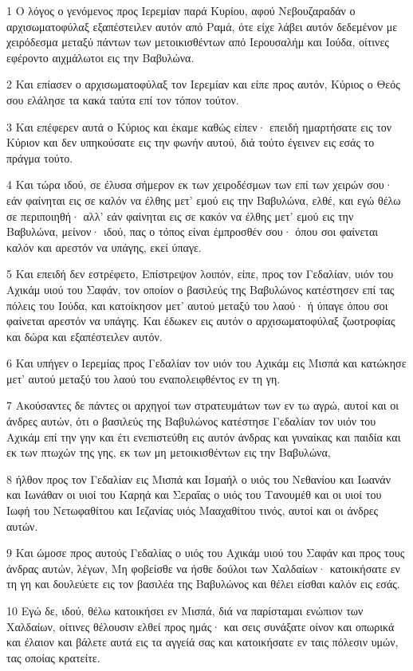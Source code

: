 \par 1 Ο λόγος ο γενόμενος προς Ιερεμίαν παρά Κυρίου, αφού Νεβουζαραδάν ο αρχισωματοφύλαξ εξαπέστειλεν αυτόν από Ραμά, ότε είχε λάβει αυτόν δεδεμένον με χειρόδεσμα μεταξύ πάντων των μετοικισθέντων από Ιερουσαλήμ και Ιούδα, οίτινες εφέροντο αιχμάλωτοι εις την Βαβυλώνα.
\par 2 Και επίασεν ο αρχισωματοφύλαξ τον Ιερεμίαν και είπε προς αυτόν, Κύριος ο Θεός σου ελάλησε τα κακά ταύτα επί τον τόπον τούτον.
\par 3 Και επέφερεν αυτά ο Κύριος και έκαμε καθώς είπεν· επειδή ημαρτήσατε εις τον Κύριον και δεν υπηκούσατε εις την φωνήν αυτού, διά τούτο έγεινεν εις εσάς το πράγμα τούτο.
\par 4 Και τώρα ιδού, σε έλυσα σήμερον εκ των χειροδέσμων των επί των χειρών σου· εάν φαίνηται εις σε καλόν να έλθης μετ' εμού εις την Βαβυλώνα, ελθέ, και εγώ θέλω σε περιποιηθή· αλλ' εάν φαίνηται εις σε κακόν να έλθης μετ' εμού εις την Βαβυλώνα, μείνον· ιδού, πας ο τόπος είναι έμπροσθέν σου· όπου σοι φαίνεται καλόν και αρεστόν να υπάγης, εκεί ύπαγε.
\par 5 Και επειδή δεν εστρέφετο, Επίστρεψον λοιπόν, είπε, προς τον Γεδαλίαν, υιόν του Αχικάμ υιού του Σαφάν, τον οποίον ο βασιλεύς της Βαβυλώνος κατέστησεν επί τας πόλεις του Ιούδα, και κατοίκησον μετ' αυτού μεταξύ του λαού· ή ύπαγε όπου σοι φαίνεται αρεστόν να υπάγης. Και έδωκεν εις αυτόν ο αρχισωματοφύλαξ ζωοτροφίας και δώρα και εξαπέστειλεν αυτόν.
\par 6 Και υπήγεν ο Ιερεμίας προς Γεδαλίαν τον υιόν του Αχικάμ εις Μισπά και κατώκησε μετ' αυτού μεταξύ του λαού του εναπολειφθέντος εν τη γη.
\par 7 Ακούσαντες δε πάντες οι αρχηγοί των στρατευμάτων των εν τω αγρώ, αυτοί και οι άνδρες αυτών, ότι ο βασιλεύς της Βαβυλώνος κατέστησε Γεδαλίαν τον υιόν του Αχικάμ επί την γην και έτι ενεπιστεύθη εις αυτόν άνδρας και γυναίκας και παιδία και εκ των πτωχών της γης, εκ των μη μετοικισθέντων εις την Βαβυλώνα,
\par 8 ήλθον προς τον Γεδαλίαν εις Μισπά και Ισμαήλ ο υιός του Νεθανίου και Ιωανάν και Ιωνάθαν οι υιοί του Καρηά και Σεραΐας ο υιός του Τανουμέθ και οι υιοί του Ιωφή του Νετωφαθίτου και Ιεζανίας υιός Μααχαθίτου τινός, αυτοί και οι άνδρες αυτών.
\par 9 Και ώμοσε προς αυτούς Γεδαλίας ο υιός του Αχικάμ υιού του Σαφάν και προς τους άνδρας αυτών, λέγων, Μη φοβείσθε να ήσθε δούλοι των Χαλδαίων· κατοικήσατε εν τη γη και δουλεύετε εις τον βασιλέα της Βαβυλώνος και θέλει είσθαι καλόν εις εσάς.
\par 10 Εγώ δε, ιδού, θέλω κατοικήσει εν Μισπά, διά να παρίσταμαι ενώπιον των Χαλδαίων, οίτινες θέλουσιν ελθεί προς ημάς· και σεις συνάξατε οίνον και οπωρικά και έλαιον και βάλετε αυτά εις τα αγγείά σας και κατοικήσατε εν ταις πόλεσιν υμών, τας οποίας κρατείτε.
